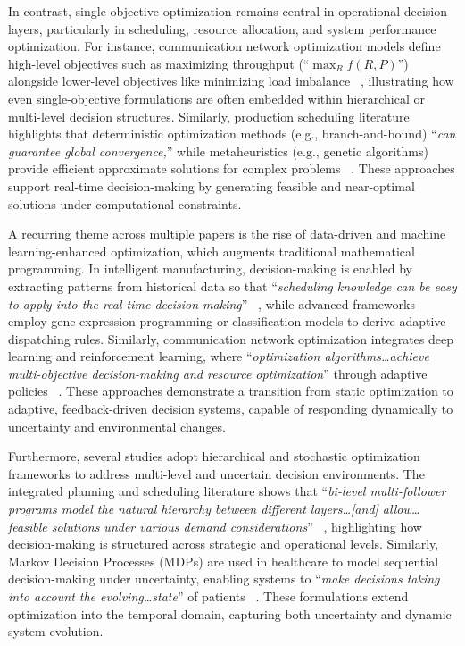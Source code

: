 \documentclass{sfuthesis}
\begin{document}
In contrast, single-objective optimization remains central in operational decision layers, particularly in scheduling, resource allocation, and system performance optimization. For instance, communication network optimization models define high-level objectives such as maximizing throughput (“$\max_{R} f(R, P)$”) alongside lower-level objectives like minimizing load imbalance ~\cite{miao2025research}, illustrating how even single-objective formulations are often embedded within hierarchical or multi-level decision structures. Similarly, production scheduling literature highlights that deterministic optimization methods (e.g., branch-and-bound) “\textit{can guarantee global convergence,}” while metaheuristics (e.g., genetic algorithms) provide efficient approximate solutions for complex problems ~\cite{zhang2021data}. These approaches support real-time decision-making by generating feasible and near-optimal solutions under computational constraints.\par
A recurring theme across multiple papers is the rise of data-driven and machine learning-enhanced optimization, which augments traditional mathematical programming. In intelligent manufacturing, decision-making is enabled by extracting patterns from historical data so that “\textit{scheduling knowledge can be easy to apply into the real-time decision-making}” ~\cite{zhang2021data}, while advanced frameworks employ gene expression programming or classification models to derive adaptive dispatching rules. Similarly, communication network optimization integrates deep learning and reinforcement learning, where “\textit{optimization algorithms…achieve multi-objective decision-making and resource optimization}” through adaptive policies ~\cite{miao2025research}. These approaches demonstrate a transition from static optimization to adaptive, feedback-driven decision systems, capable of responding dynamically to uncertainty and environmental changes.\par
Furthermore, several studies adopt hierarchical and stochastic optimization frameworks to address multi-level and uncertain decision environments. The integrated planning and scheduling literature shows that “\textit{bi-level multi-follower programs model the natural hierarchy between different layers…[and] allow…feasible solutions under various demand considerations}” ~\cite{beykal2022data}, highlighting how decision-making is structured across strategic and operational levels. Similarly, Markov Decision Processes (MDPs) are used in healthcare to model sequential decision-making under uncertainty, enabling systems to “\textit{make decisions taking into account the evolving…state}” of patients ~\cite{svavza2024data}. These formulations extend optimization into the temporal domain, capturing both uncertainty and dynamic system evolution.\par
\end{document}
